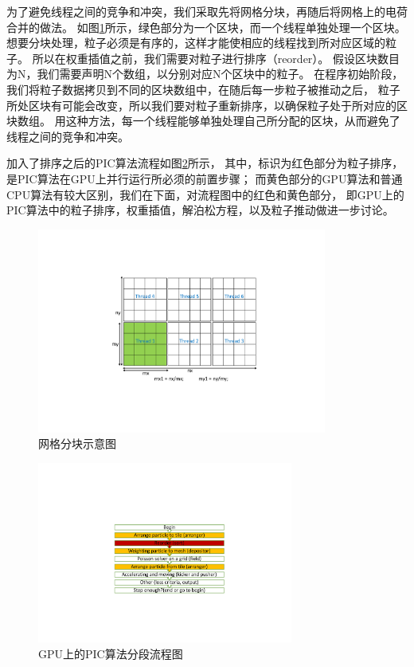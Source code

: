 为了避免线程之间的竞争和冲突，我们采取先将网格分块，再随后将网格上的电荷合并的做法。
如图\ref{fig:PIC_tile}所示，绿色部分为一个区块，而一个线程单独处理一个区块。
想要分块处理，粒子必须是有序的，这样才能使相应的线程找到所对应区域的粒子。
所以在权重插值之前，我们需要对粒子进行排序（reorder）。
假设区块数目为N，我们需要声明N个数组，以分别对应N个区块中的粒子。
在程序初始阶段，我们将粒子数据拷贝到不同的区块数组中，在随后每一步粒子被推动之后，
粒子所处区块有可能会改变，所以我们要对粒子重新排序，以确保粒子处于所对应的区块数组。
用这种方法，每一个线程能够单独处理自己所分配的区块，从而避免了线程之间的竞争和冲突。

加入了排序之后的PIC算法流程如图\ref{fig:PIC_flow_reorder}所示，
其中，标识为红色部分为粒子排序，是PIC算法在GPU上并行运行所必须的前置步骤；
而黄色部分的GPU算法和普通CPU算法有较大区别，我们在下面，对流程图中的红色和黄色部分，
即GPU上的PIC算法中的粒子排序，权重插值，解泊松方程，以及粒子推动做进一步讨论。

\begin{figure}[!htb]
    \centering
    \includegraphics[width=0.85\textwidth]{Img/3PIC_tile.pdf}
    \caption{网格分块示意图}
    \label{fig:PIC_tile}
\end{figure}

\begin{figure}[!htb]
    \centering
    \includegraphics[width=0.75\textwidth]{Img/3PIC_flow_reorder.pdf}
    \caption{GPU上的PIC算法分段流程图}
    \label{fig:PIC_flow_reorder}
\end{figure}



